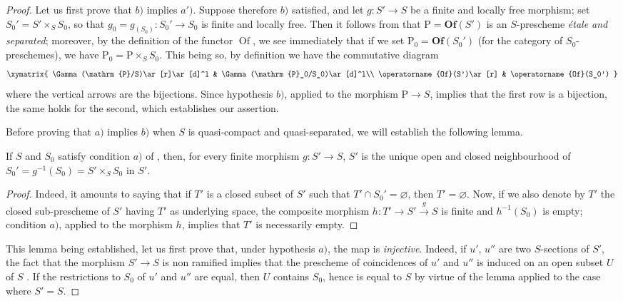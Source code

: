 \begin{proof}
Let us first prove that $b)$ implies $a')$.
Suppose therefore $b)$ satisfied, and let $g:S'\to S$ be a finite and locally free morphism;
set $S_0'=S'\times_S S_0$, so that $g_0=g_{(S_0)}:S_0'\to S_0$ is finite and locally free.
Then it follows from  that $\mathrm{P}=\mathbf{Of}(S')$ is an $S$-prescheme \emph{\'etale and separated};
moreover, by the definition of the functor $\operatorname{Of}$, we see immediately that if we set $\mathrm{P}_0=\mathbf{Of}(S_0')$ (for the category of $S_0$-preschemes), we have $\mathrm{P}_0=\mathrm{P}\times_S S_0$.
This being so, by definition we have the commutative diagram
\[
\xymatrix{
\Gamma(\mathrm{P}/S)\ar[r]\ar[d]^l & \Gamma(\mathrm{P}_0/S_0)\ar[d]^l\\
\operatorname{Of}(S')\ar[r] & \operatorname{Of}(S_0')
}
\]
where the vertical arrows are the bijections.
Since hypothesis $b)$, applied to the morphism $\mathrm{P}\to S$, implies that the first row is a bijection, the same holds for the second, which establishes our assertion.

Before proving that $a)$ implies $b)$ when $S$ is quasi-compact and quasi-separated, we will establish the following lemma.

\begin{lemma}[18.5.4.3]
\label{IV.18.5.4.3}
If $S$ and $S_0$ satisfy condition $a)$ of , then, for every finite morphism $g:S'\to S$, $S'$ is the unique open and closed neighbourhood of $S_0'=g^{-1}(S_0)=S'\times_S S_0$ in $S'$.
\end{lemma}

\begin{proof}
Indeed, it amounts to saying that if $T'$ is a closed subset of $S'$ such that $T'\cap S_0'=\varnothing$, then $T'=\varnothing$.
Now, if we also denote by $T'$ the closed sub-prescheme of $S'$ having $T'$ as underlying space, the composite morphism $h:T'\to S'\xrightarrow{g}S$ is finite and $h^{-1}(S_0)$ is empty;
condition $a)$, applied to the morphism $h$, implies that $T'$ is necessarily empty.
\end{proof}

This lemma being established, let us first prove that, under hypothesis $a)$, the map  is \emph{injective}.
Indeed, if $u'$, $u''$ are two $S$-sections of $S'$, the fact that the morphism $S'\to S$ is non ramified implies that the prescheme of coincidences of $u'$ and $u''$ is induced on an open subset $U$ of $S$ .
If the restrictions to $S_0$ of $u'$ and $u''$ are equal, then $U$ contains $S_0$, hence is equal to $S$ by virtue of the lemma  applied to the case where $S'=S$.


\end{proof}
